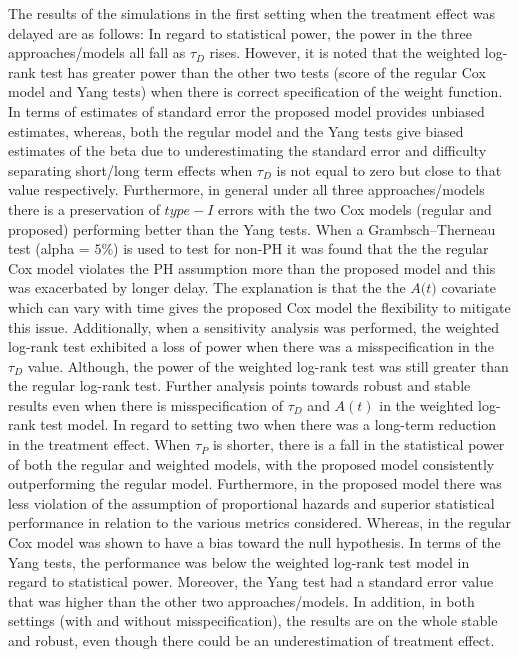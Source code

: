 \documentclass[12pt,twoside]{reedthesis}
\begin{document}
The results of the simulations in the first setting when the treatment effect was delayed are as follows: In regard to statistical power, the power in the three approaches/models all fall as \(\tau_{D}\) rises. However, it is noted that the weighted log-rank test has greater power than the other two tests (score of the regular Cox model and Yang tests) when there is correct specification of the weight function. In terms of estimates of standard error the proposed model provides unbiased estimates, whereas, both the regular model and the Yang tests give biased estimates of the beta due to underestimating the standard error and difficulty separating short/long term effects when \(\tau_{D}\) is not equal to zero but close to that value respectively. Furthermore, in general under all three approaches/models there is a preservation of \(type-I\) errors with the two Cox models (regular and proposed) performing better than the Yang tests.
When a Grambsch--Therneau test (alpha = \(5\%\)) is used to test for non-PH it was found that the the regular Cox model violates the PH assumption more than the proposed model and this was exacerbated by longer delay. The explanation is that the the \(\textit{A(t)}\) covariate which can vary with time gives the proposed Cox model the flexibility to mitigate this issue.
Additionally, when a sensitivity analysis was performed, the weighted log-rank test exhibited a loss of power when there was a misspecification in the \(\tau_{D}\) value. Although, the power of the weighted log-rank test was still greater than the regular log-rank test. Further analysis points towards robust and stable results even when there is misspecification of \(\tau_{D}\) and \(A(t)\) in the weighted log-rank test model.
In regard to setting two when there was a long-term reduction in the treatment effect. When \(\tau_{P}\) is shorter, there is a fall in the statistical power of both the regular and weighted models, with the proposed model consistently outperforming the regular model. Furthermore, in the proposed model there was less violation of the assumption of proportional hazards and superior statistical performance in relation to the various metrics considered. Whereas, in the regular Cox model was shown to have a bias toward the null hypothesis. In terms of the Yang tests, the performance was below the weighted log-rank test model in regard to statistical power. Moreover, the Yang test had a standard error value that was higher than the other two approaches/models. In addition, in both settings (with and without misspecification), the results are on the whole stable and robust, even though there could be an underestimation of treatment effect.\\
\end{document}
